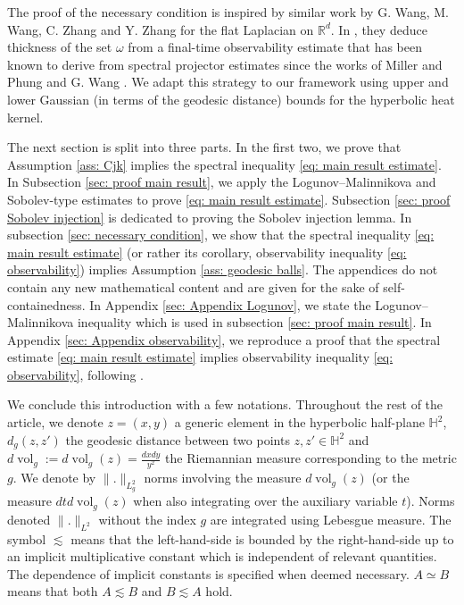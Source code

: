 \documentclass[letterpaper,11pt]{amsart}
\theoremstyle{note}
\numberwithin{equation}{section}
\DeclareMathOperator{\vol}{vol}
\begin{document}
The proof of the necessary condition is inspired by similar work by G. Wang, M. Wang, C. Zhang and Y. Zhang for the flat Laplacian on $\mathbb{R}^d$. In \cite{wangwangzhangzhang2019spectralineq_heat}, they deduce thickness of the set $\omega$ from a final-time observability estimate that has been known to derive from spectral projector estimates since the works of Miller \cite{miller2010directlebeaurobbiano} and Phung and G. Wang \cite{phungwang2013observability}. We adapt this strategy to our framework using upper and lower Gaussian (in terms of the geodesic distance) bounds for the hyperbolic heat kernel.

The next section is split into three parts. In the first two, we prove that Assumption \ref{ass: Cjk} implies the spectral inequality \eqref{eq: main result estimate}. In Subsection \ref{sec: proof main result}, we apply the Logunov--Malinnikova and Sobolev-type estimates to prove \eqref{eq: main result estimate}. Subsection \ref{sec: proof Sobolev injection} is dedicated to proving the Sobolev injection lemma. In subsection \ref{sec: necessary condition}, we show that the spectral inequality \eqref{eq: main result estimate} (or rather its corollary, observability inequality \eqref{eq: observability}) implies Assumption \ref{ass: geodesic balls}. The appendices do not contain any new mathematical content and are given for the sake of self-containedness. In Appendix \ref{sec: Appendix Logunov}, we state the Logunov--Malinnikova inequality which is used in subsection \ref{sec: proof main result}. In Appendix \ref{sec: Appendix observability}, we reproduce a proof that the spectral estimate \eqref{eq: main result estimate} implies observability inequality \eqref{eq: observability}, following \cite{wangwangzhangzhang2019spectralineq_heat}.

We conclude this introduction with a few notations. Throughout the rest of the article, we denote $z=(x,y)$ a generic element in the hyperbolic half-plane $\mathbb{H}^2$, $d_g(z,z')$ the geodesic distance between two points $z, z' \in \mathbb{H}^2$ and $d\vol_g:= d\vol_g(z) = \frac{dxdy}{y^2}$ the Riemannian measure corresponding to the metric $g$. We denote by $\|.\|_{L^2_g}$ norms involving the measure $d\vol_g(z)$ (or the measure $dtd\vol_g(z)$ when also integrating over the auxiliary variable $t$). Norms denoted $\|.\|_{L^2}$ without the index $g$ are integrated using Lebesgue measure. The symbol $\lesssim$ means that the left-hand-side is bounded by the right-hand-side up to an implicit multiplicative constant which is independent of relevant quantities. The dependence of implicit constants is specified when deemed necessary. $A \simeq B$ means that both $A \lesssim B$ and $B \lesssim A$ hold.
\end{document}
